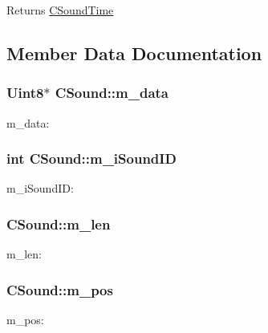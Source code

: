 \begin{DoxyReturn}{Returns}
\hyperlink{class_c_sound_time}{C\+Sound\+Time} 
\end{DoxyReturn}


\subsection{Member Data Documentation}
\subsubsection[{\texorpdfstring{m\+\_\+data}{m_data}}]{\setlength{\rightskip}{0pt plus 5cm}Uint8$\ast$ C\+Sound\+::m\+\_\+data}\hypertarget{class_c_sound_a3f49133f65666c8edd9f46d7c9f49161}{}\label{class_c_sound_a3f49133f65666c8edd9f46d7c9f49161}
m\+\_\+data\+: 
\subsubsection[{\texorpdfstring{m\+\_\+i\+Sound\+ID}{m_iSoundID}}]{\setlength{\rightskip}{0pt plus 5cm}int C\+Sound\+::m\+\_\+i\+Sound\+ID}\hypertarget{class_c_sound_a267778ee9ca3f7fed5b344a09a24f2eb}{}\label{class_c_sound_a267778ee9ca3f7fed5b344a09a24f2eb}
m\+\_\+i\+Sound\+ID\+: 
\subsubsection[{\texorpdfstring{m\+\_\+len}{m_len}}]{ C\+Sound\+::m\+\_\+len}\hypertarget{class_c_sound_a1e31a63957e73925bee5871f85e5f2f6}{}\label{class_c_sound_a1e31a63957e73925bee5871f85e5f2f6}
m\+\_\+len\+: 
\subsubsection[{\texorpdfstring{m\+\_\+pos}{m_pos}}]{ C\+Sound\+::m\+\_\+pos}\hypertarget{class_c_sound_aa1b6ed3838420f7d7c99ca7805106829}{}\label{class_c_sound_aa1b6ed3838420f7d7c99ca7805106829}
m\+\_\+pos\+: 
